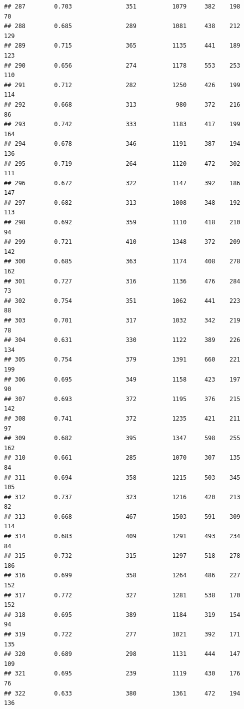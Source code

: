 \documentclass[]{book}
\begin{document}
\begin{verbatim}
## 287        0.703               351          1079     382    198     70
## 288        0.685               289          1081     438    212    129
## 289        0.715               365          1135     441    189    123
## 290        0.656               274          1178     553    253    110
## 291        0.712               282          1250     426    199    114
## 292        0.668               313           980     372    216     86
## 293        0.742               333          1183     417    199    164
## 294        0.678               346          1191     387    194    136
## 295        0.719               264          1120     472    302    111
## 296        0.672               322          1147     392    186    147
## 297        0.682               313          1008     348    192    113
## 298        0.692               359          1110     418    210     94
## 299        0.721               410          1348     372    209    142
## 300        0.685               363          1174     408    278    162
## 301        0.727               316          1136     476    284     73
## 302        0.754               351          1062     441    223     88
## 303        0.701               317          1032     342    219     78
## 304        0.631               330          1122     389    226    134
## 305        0.754               379          1391     660    221    199
## 306        0.695               349          1158     423    197     90
## 307        0.693               372          1195     376    215    142
## 308        0.741               372          1235     421    211     97
## 309        0.682               395          1347     598    255    162
## 310        0.661               285          1070     307    135     84
## 311        0.694               358          1215     503    345    105
## 312        0.737               323          1216     420    213     82
## 313        0.668               467          1503     591    309    114
## 314        0.683               409          1291     493    234     84
## 315        0.732               315          1297     518    278    186
## 316        0.699               358          1264     486    227    152
## 317        0.772               327          1281     538    170    152
## 318        0.695               389          1184     319    154     94
## 319        0.722               277          1021     392    171    135
## 320        0.689               298          1131     444    147    109
## 321        0.695               239          1119     430    176     76
## 322        0.633               380          1361     472    194    136

\end{verbatim}
\end{document}
